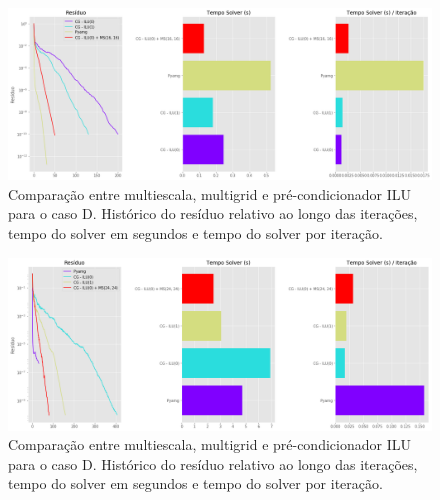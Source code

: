 
\begin{figure}[!htbp]
    \label{fig:casoD_2}
    \centering
    \includegraphics[width=\textwidth]{chap08/figs/casoD_2.png}
    \caption{Comparação entre multiescala, multigrid e pré-condicionador ILU para o caso D. Histórico do resíduo relativo ao longo das iterações, tempo do solver em segundos e tempo do solver por iteração. }
    \end{figure}
    
    
    \begin{figure}[!htbp]
    \label{fig:casoE_2}
    \centering
    \includegraphics[width=\textwidth]{chap08/figs/casoE_2.png}
    \caption{Comparação entre multiescala, multigrid e pré-condicionador ILU para o caso D. Histórico do resíduo relativo ao longo das iterações, tempo do solver em segundos e tempo do solver por iteração. }
    \end{figure}
